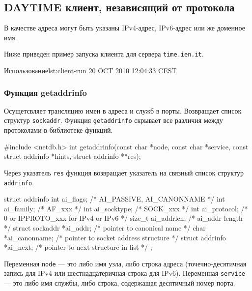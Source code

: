 \subsection{DAYTIME клиент, независящий от протокола}
В качестве адреса могут быть указаны IPv4-адрес, IPv6-адрес или же доменное имя.



Ниже приведен пример запуска клиента для сервера \texttt{time.ien.it}.
\begin{plainlst}{Использование}{lst:client-run}
20 OCT 2010 12:04:33 CEST
\end{plainlst}

\subsubsection{Функция getaddrinfo}
Осущетсвляет трансляцию имен в адреса и служб в порты. Возвращает список структур \lstinline{sockaddr}. Функция \lstinline{getaddrinfo} скрывает все различия между протоколами в библиотеке функций.

\begin{clst}{}{}
#include <netdb.h>
int getaddrinfo(const char *node, const char *service,
                const struct addrinfo *hints,
                struct addrinfo **res);
\end{clst}

Через указатель \lstinline{res} функция возвращает указатель на связный список структур \lstinline{addrinfo}.
\begin{clst}{}{}
struct addrinfo {
  int              ai_flags;      /* AI_PASSIVE, AI_CANONNAME */
  int              ai_family;     /* AF_xxx */
  int              ai_socktype;   /* SOCK_xxx */
  int              ai_protocol;   /* 0 or IPPROTO_xxx for IPv4 or IPv6 */
  size_t           ai_addrlen;    /* ai_addr length */
  struct sockaddr *ai_addr;       /* pointer to canonical name */
  char            *ai_canonname;  /* pointer to socket address structure */
  struct addrinfo *ai_next;       /* pointer to next structure in list */
};
\end{clst}

Переменная \lstinline{node} --- это либо имя узла, либо строка адреса (точечно-десятичная запись для IPv4 или шестнадцатеричная строка для IPv6). Переменная \lstinline{service} --- это либо имя службы, либо строка, содержащая десятичный номер порта.

